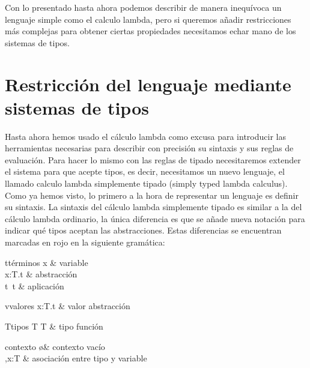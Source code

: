 Con lo presentado hasta ahora podemos describir de manera inequívoca un lenguaje simple como el calculo lambda, pero si queremos añadir restricciones más complejas para obtener ciertas propiedades necesitamos echar mano de los sistemas de tipos.\\


\section{Restricción del lenguaje mediante sistemas de tipos}

Hasta ahora hemos usado el cálculo lambda como excusa para introducir las herramientas
necesarias para describir con precisión su sintaxis y sus reglas de evaluación.
Para hacer lo mismo con las reglas de tipado necesitaremos extender el sistema para
que acepte tipos, es decir, necesitamos un nuevo lenguaje, el llamado calculo lambda
simplemente tipado (simply typed lambda calculus).\\

Como ya hemos visto, lo primero a la hora de representar un lenguaje es definir su sintaxis.
La sintaxis del cálculo lambda simplemente tipado es similar a la del cálculo lambda ordinario, la única 
diferencia es que se añade nueva notación para indicar qué tipos aceptan las abstracciones. Estas diferencias
se encuentran marcadas en rojo en la siguiente gramática:\\

\begin{grammar}{t}{términos}
  x             & variable \\
  \lambda x\textcolor{myred}{:T}.t     & abstracción \\
  t\ t           & aplicación
\end{grammar}

\begin{grammar}{v}{valores}
  \lambda x\textcolor{myred}{:T}.t     & valor abstracción
\end{grammar}

{\color{myred}
\begin{grammar}{T}{tipos}
  T \to T    & tipo función
\end{grammar}
}

{\color{myred}
\begin{grammar}{\Gamma}{contexto}
  \o    & contexto vacío \\
  \Gamma,x:T    & asociación entre tipo y variable
\end{grammar}}

